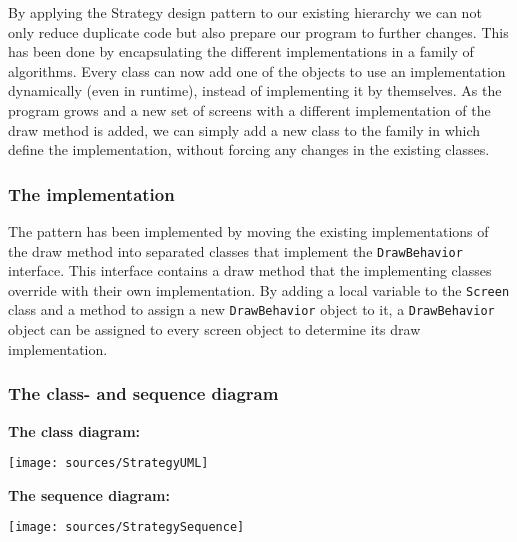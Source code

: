 \documentclass[a4paper,11pt,report]{scrartcl}
\begin{document}
By applying the Strategy design pattern to our existing hierarchy we can not
only reduce duplicate code but also prepare our program to further changes.
This has been done by encapsulating the different implementations in a family
of algorithms. Every class can now add one of the objects to use an implementation
dynamically (even in runtime), instead of implementing it by themselves. As
the program grows and a new set of screens with a different implementation
of the draw method is added, we can simply add a new class to the family
in which define the implementation, without forcing any changes in the existing
classes.

\subsubsection{The implementation}
The pattern has been implemented by moving the existing implementations of the
draw method into separated classes that implement the \texttt{DrawBehavior} interface.
This interface contains a draw method that the implementing classes override
with their own implementation. By adding a local variable to the
\texttt{Screen} class and a method to assign a new \texttt{DrawBehavior} object to it, a
\texttt{DrawBehavior} object can be assigned to every screen object to determine its
draw implementation.

\newpage\subsubsection{The class- and sequence diagram}
\textbf{The class diagram:}\\
\centerline{\texttt{[image: sources/StrategyUML]}}

\newpage\textbf{The sequence diagram:}\\
\centerline{\texttt{[image: sources/StrategySequence]}}
\end{document}
